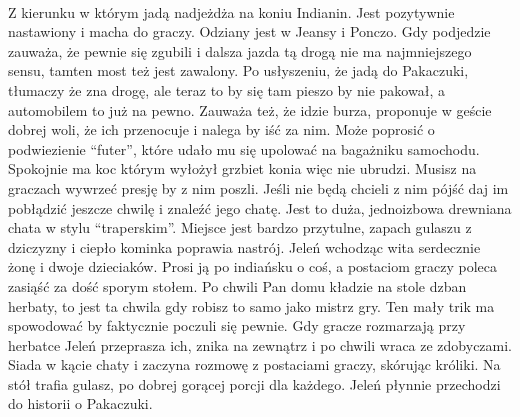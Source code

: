 \documentclass[ms,a4paper]{memoir}
\begin{document}
\paragraph{}
Z kierunku w którym jadą nadjeżdża na koniu Indianin.
Jest pozytywnie nastawiony i macha do graczy.
Odziany jest w Jeansy i Ponczo.
Gdy podjedzie zauważa, że pewnie się zgubili i dalsza jazda tą drogą nie ma najmniejszego sensu, tamten most też jest zawalony.
Po usłyszeniu, że jadą do Pakaczuki, tłumaczy że zna drogę, ale teraz to by się tam pieszo by nie pakował, a automobilem to już na pewno.
Zauważa też, że idzie burza, proponuje w geście dobrej woli, że ich przenocuje i nalega by iść za nim.
Może poprosić o podwiezienie ``futer'', które udało mu się upolować na bagażniku samochodu.
Spokojnie ma koc którym wyłożył grzbiet konia więc nie ubrudzi.
Musisz na graczach wywrzeć presję by z nim poszli.
Jeśli nie będą chcieli z nim pójść daj im pobłądzić jeszcze chwilę i znaleźć jego chatę.
Jest to duża, jednoizbowa drewniana chata w stylu ``traperskim''.
Miejsce jest bardzo przytulne, zapach gulaszu z dziczyzny i ciepło kominka poprawia nastrój.
Jeleń wchodząc wita serdecznie żonę i dwoje dzieciaków.
Prosi ją po indiańsku o coś, a postaciom graczy poleca zasiąść za dość sporym stołem.
Po chwili Pan domu kładzie na stole dzban herbaty, to jest ta chwila gdy robisz to samo jako mistrz gry.
Ten mały trik ma spowodować by faktycznie poczuli się pewnie.
Gdy gracze rozmarzają przy herbatce Jeleń przeprasza ich, znika na zewnątrz i po chwili wraca ze zdobyczami.
Siada w kącie chaty i zaczyna rozmowę z postaciami graczy, skórując króliki.
Na stół trafia gulasz, po dobrej gorącej porcji dla każdego.
Jeleń płynnie przechodzi do historii o Pakaczuki.
\end{document}
